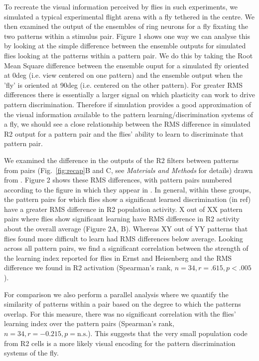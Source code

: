 To recreate the visual information perceived by flies in such experiments, we simulated a typical experimental flight arena with a fly tethered in the centre. We then examined the output of the ensembles of ring neurons for a fly fixating the two patterns within a stimulus pair. Figure 1 shows one way we can analyse this by looking at the simple difference between the ensemble outputs for simulated flies looking at the patterns within a pattern pair. We do this by taking the Root Mean Square difference between the ensemble ouput for a simulated fly oriented at 0deg (i.e. view centered on one pattern) and the ensemble output when the 'fly' is oriented at 90deg (i.e. centered on the other pattern). For greater RMS differences there is essentially a larger signal on which plasticity can work to drive pattern discrimination. Therefore if simulation provides a good approximation of the visual information available to the pattern learning/discrimination systems of a fly, we should see a close relationship between the RMS difference in simulated R2 output for a pattern pair and the flies' ability to learn to discriminate that pattern pair.

We examined the difference in the outputs of the R2 filters between patterns from pairs (Fig.~\ref{fig:recap}B and C, see \emph{Materials and Methods} for details) drawn from \cite{Ernst1999}. Figure 2 shows these RMS differences, with pattern pairs numbered according to the figure in which they appear in \cite{Ernst1999}. In general, within these groups, the pattern pairs for which flies show a significant learned discrimination (in ref) have a greater RMS difference in R2 population activity. X out of XX pattern pairs where flies show significant learning have RMS difference in R2 activity about the overall average (Figure 2A, B). Whereas XY out of YY patterns that flies found more difficult to learn had RMS differences below average. Looking across all pattern pairs, we find a significant correlation between the strength of the learning index reported for flies in Ernst and Heisenberg \cite{Ernst1999} and the RMS difference we found in R2 activation (Spearman's rank, $n=34, r=.615, p<.005$).


For comparison we also perform a parallel analysis where we quantify the similarity of patterns within a pair based on the degree to which the patterns overlap. For this measure, there was no significant correlation with the flies' learning index over the pattern pairs (Spearman's rank, $n=34, r= -0.215, p=\mathrm{n.s.}$). This suggests that the very small population code from R2 cells is a more likely visual encoding for the pattern discrimination systems of the fly.

